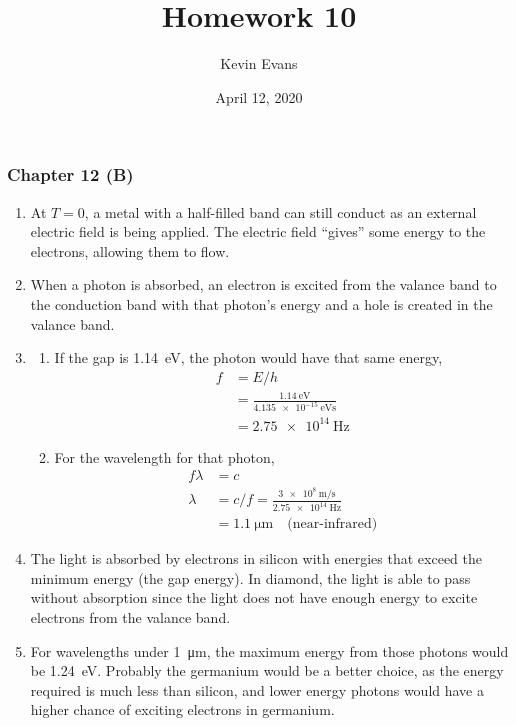 \documentclass{homework}
\title{Homework 10}
\author{Kevin Evans}
\date{April 12, 2020}
\begin{document}
	\maketitle
	\subsubsection*{Chapter 12 (B)}
	\begin{enumerate}[label={\arabic*.}]%
		\item At $T=0$, a metal with a half-filled band can still conduct as an external electric field is being applied. The electric field ``gives'' some energy to the electrons, allowing them to flow.
		
		\item When a photon is absorbed, an electron is excited from the valance band to the conduction band with that photon's energy and a hole is created in the valance band. 
		
		\item \begin{enumerate}
			\item If the gap is \SI{1.14}{\eV}, the photon would have that same energy, \begin{align*}
					f & = E / h \\
						& = \frac{ \SI{1.14}{\eV} }{ \SI{4.135e-15}{\eV \s} } \\
						& = \SI{2.75e14}{\Hz}
			\end{align*}
			\item For the wavelength for that photon, \begin{align*}
				f\lambda & = c \\
				\lambda & =  c / f = \frac{\SI{3e8}{\m\per\s}}{\SI{2.75e14}{\Hz}} \\
					& = \SI{1.1}{\um} \quad \text{(near-infrared)}
			\end{align*}
		\end{enumerate}
	
		\item The light is absorbed by electrons in silicon with energies that exceed the minimum energy (the gap energy). In diamond, the light is able to pass without absorption since the light does not have enough energy to excite electrons from the valance band. 
		
		\item For wavelengths under \SI{1}{\um}, the maximum energy from those photons would be \SI{1.24}{\eV}. Probably the germanium would be a better choice, as the energy required is much less than silicon, and lower energy photons would have a higher chance of exciting electrons in germanium.
		

\end{enumerate}
\end{document}
